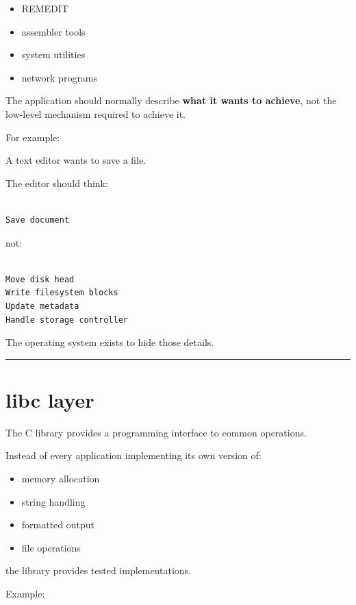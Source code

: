 \documentclass[
  oneside,
  openany]{book}
\providecommand{\tightlist}{%
  \setlength{\itemsep}{0pt}\setlength{\parskip}{0pt}}
\begin{document}
\begin{itemize}
\tightlist
\item
  REMEDIT
\item
  assembler tools
\item
  system utilities
\item
  network programs
\end{itemize}

The application should normally describe \textbf{what it wants to
achieve}, not the low-level mechanism required to achieve it.

For example:

A text editor wants to save a file.

The editor should think:

\begin{verbatim}

Save document
\end{verbatim}

not:

\begin{verbatim}

Move disk head
Write filesystem blocks
Update metadata
Handle storage controller
\end{verbatim}

The operating system exists to hide those details.

\begin{center}\rule{0.5\linewidth}{0.5pt}\end{center}

\hypertarget{libc-layer}{%
\section{libc layer}\label{libc-layer}}

The C library provides a programming interface to common operations.

Instead of every application implementing its own version of:

\begin{itemize}
\tightlist
\item
  memory allocation
\item
  string handling
\item
  formatted output
\item
  file operations
\end{itemize}

the library provides tested implementations.

Example:
\end{document}
